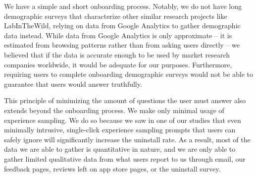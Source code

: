 We have a simple and short onboarding process. Notably, we do not have long demographic surveys that characterize other similar research projects like LabInTheWild, relying on data from Google Analytics to gather demographic data instead. While data from Google Analytics is only approximate -- it is estimated from browsing patterns rather than from asking users directly -- we believed that if the data is accurate enough to be used by market research companies worldwide, it would be adequate for our purposes. Furthermore, requiring users to complete onboarding demographic surveys would not be able to guarantee that users would answer truthfully.

This principle of minimizing the amount of questions the user must answer also extends beyond the onboarding process. We make only minimal usage of experience sampling. We do so because we saw in one of our studies that even minimally intrusive, single-click experience sampling prompts that users can safely ignore will significantly increase the uninstall rate. As a result, most of the data we are able to gather is quantitative in nature, and we are only able to gather limited qualitative data from what users report to us through email, our feedback pages, reviews left on app store pages, or the uninstall survey.





